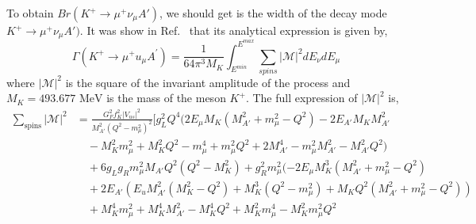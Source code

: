 \documentclass[onecolumn, aps, nofootinbib, prd, preprint, floats, floatfix, amsmath, amssymb, superscriptaddress, preprintnumbers]{revtex4-1}
\begin{document}
{To obtain $Br(K^+ \to \mu^+ \nu_\mu A')$, we should get is the width of the decay mode $K^+ \to \mu^+ \nu_\mu A')$. It was show in Ref.~\cite{cogollo2025constraints} that its analytical expression is given by,
\begin{equation}
\Gamma(K^{+} \rightarrow \mu^{+} 
u_{\mu} A^{\prime}) = \frac{1}{64\pi^{3}M_{K}} \int_{E^{min}}^{E^{max}} \sum_{spins} |\mathcal{M}|^{2} dE_{\nu} dE_{\mu}
\end{equation}
where $|\mathcal{M}|^{2}$ is the square of the invariant amplitude of the process and $M_{K} = 493.677\text{ MeV}$ is the mass of the meson $K^{+}$. 
The full expression of $|\mathcal{M}|^{2}$ is,
\begin{equation}
\begin{split}
\sum_{\text{spins}} |\mathcal{M}|^2 &= \frac{G_F^2 f_K^2 |V_{us}|^2}{M_{A'}^2 (Q^2 - m_\mu^2)^2} \Big[ g_L^2 Q^4 (2 E_\mu M_K (M_{A'}^2 + m_\mu^2 - Q^2) - 2 E_{A'} M_K M_{A'}^2 \\
&\quad - M_K^2 m_\mu^2 + M_K^2 Q^2 - m_\mu^4 + m_\mu^2 Q^2 + 2 M_{A'}^4 - m_\mu^2 M_{A'}^2 - M_{A'}^2 Q^2) \\
&\quad + 6 g_L g_R m_\mu^2 M_{A'} Q^2 (Q^2 - M_K^2) + g_R^2 m_\mu^2 (-2 E_\mu M_K^3 (M_{A'}^2 + m_\mu^2 - Q^2) \\
&\quad + 2 E_{A'} (E_
u M_{A'}^2 (M_K^2 - Q^2) + M_K^3 (Q^2 - m_\mu^2) + M_K Q^2 (M_{A'}^2 + m_\mu^2 - Q^2)) \\
&\quad + M_K^4 m_\mu^2 + M_K^4 M_{A'}^2 - M_K^4 Q^2 + M_K^2 m_\mu^4 - M_K^2 m_\mu^2 Q^2 \\

\end{split}
\end{equation}}
\end{document}

